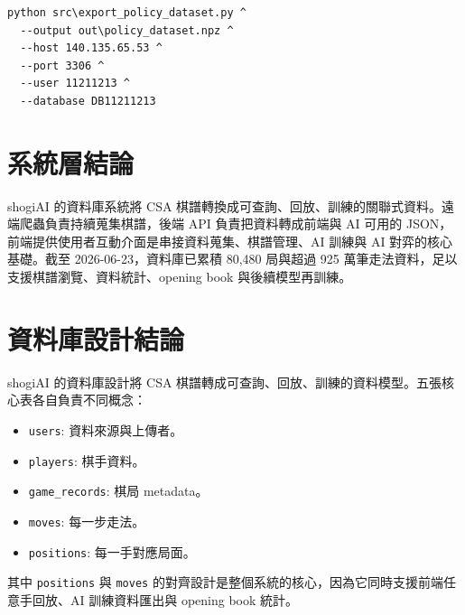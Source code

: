 \documentclass[12pt,a4paper,fontset=none]{ctexart}
\begin{document}
\begin{lstlisting}[style=cmd]
python src\export_policy_dataset.py ^
  --output out\policy_dataset.npz ^
  --host 140.135.65.53 ^
  --port 3306 ^
  --user 11211213 ^
  --database DB11211213
\end{lstlisting}

\section{系統層結論}

shogiAI 的資料庫系統將 CSA 棋譜轉換成可查詢、回放、訓練的關聯式資料。遠端爬蟲負責持續蒐集棋譜，後端 API 負責把資料轉成前端與 AI 可用的 JSON，前端提供使用者互動介面是串接資料蒐集、棋譜管理、AI 訓練與 AI 對弈的核心基礎。截至 2026-06-23，資料庫已累積 80,480 局與超過 925 萬筆走法資料，足以支援棋譜瀏覽、資料統計、opening book 與後續模型再訓練。

\appendix

\section{資料庫設計結論}

shogiAI 的資料庫設計將 CSA 棋譜轉成可查詢、回放、訓練的資料模型。五張核心表各自負責不同概念：

\begin{itemize}
  \item \texttt{users}: 資料來源與上傳者。
  \item \texttt{players}: 棋手資料。
  \item \texttt{game\_records}: 棋局 metadata。
  \item \texttt{moves}: 每一步走法。
  \item \texttt{positions}: 每一手對應局面。
\end{itemize}

其中 \texttt{positions} 與 \texttt{moves} 的對齊設計是整個系統的核心，因為它同時支援前端任意手回放、AI 訓練資料匯出與 opening book 統計。
\end{document}
